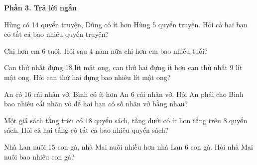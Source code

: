 \textbf{Phần 3. Trả lời ngắn}

\begin{ex} %
Hùng có 14 quyển truyện, Dũng có ít hơn Hùng 5 quyển truyện. Hỏi cả hai bạn có tất cả bao nhiêu quyển truyện?
\end{ex}

\begin{ex} %
Chị hơn em 6 tuổi. Hỏi sau 4 năm nữa chị hơn em bao nhiêu tuổi?
\end{ex}

\begin{ex} %
Can thứ nhất đựng 18 lít mật ong, can thứ hai đựng ít hơn can thứ nhất 9 lít mật ong. Hỏi can thứ hai đựng bao nhiêu lít mật ong?
\end{ex}

\begin{ex} %
An có 16 cái nhãn vở, Bình có ít hơn An 6 cái nhãn vở. Hỏi An phải cho Bình bao nhiêu cái nhãn vở để hai bạn có số nhãn vở bằng nhau?
\end{ex}

\begin{ex} %
Một giá sách tầng trên có 18 quyển sách, tầng dưới có ít hơn tầng trên 8 quyển sách. Hỏi cả hai tầng có tất cả bao nhiêu quyển sách?
\end{ex}

\begin{ex} %
Nhà Lan nuôi 15 con gà, nhà Mai nuôi nhiều hơn nhà Lan 6 con gà. Hỏi nhà Mai nuôi bao nhiêu con gà?
\end{ex}
